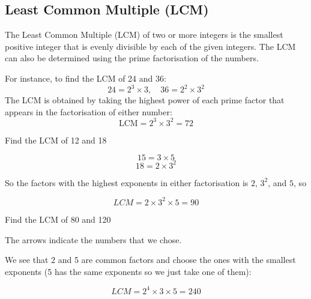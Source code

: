 \subsection*{Least Common Multiple (LCM)}
The Least Common Multiple (LCM) of two or more integers is the smallest positive integer that is evenly divisible by each of the given integers. The LCM can also be determined using the prime factorisation of the numbers. 

For instance, to find the LCM of 24 and 36:
\[
24 = 2^3 \times 3, \quad 36 = 2^2 \times 3^2
\]
The LCM is obtained by taking the highest power of each prime factor that appears in the factorisation of either number:
\[
\text{LCM} = 2^3 \times 3^2 = 72
\]

\begin{example} Find the LCM of 12 and 18

\begin{solution}
\[
15 = 3\times 5
\]
\[
18 = 2 \times 3^2
\]

So the factors with the highest exponents in either factorisation is $2$, $3^2$, and $5$, so

\[
LCM = 2 \times 3^2 \times 5 = 90
\]
    
\end{solution}
    
\end{example}

\begin{example} Find the LCM of 80 and 120

\begin{solution}
    

The arrows indicate the numbers that we chose.


We see that 2 and 5 are common factors and choose the ones with the smallest exponents (5 has the same exponents so we just take one of them):

\[
LCM = 2^4\times 3 \times 5 = 240
\]
\end{solution}

\end{example}


